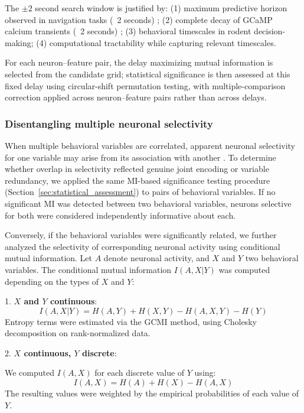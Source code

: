 The $\pm2$ second search window is justified by: (1) maximum predictive horizon
observed in navigation tasks (~2 seconds) \citep{Lian2022}; (2) complete decay of
GCaMP calcium transients (~2 seconds) \citep{Zhang2023}; (3) behavioral timescales
in rodent decision-making; (4) computational tractability while capturing relevant
timescales.

For each neuron--feature pair, the delay maximizing mutual information is selected
from the candidate grid; statistical significance is then assessed at this fixed
delay using circular-shift permutation testing, with multiple-comparison correction
applied across neuron--feature pairs rather than across delays.


\subsubsection{Disentangling multiple neuronal selectivity}
\label{sec:disentangling_selectivity}


When multiple behavioral variables are correlated, apparent neuronal selectivity
for one variable may arise from its association with another \citep{mix,mix3}.
To determine whether overlap in selectivity reflected genuine joint encoding or
variable redundancy, we applied the same MI-based significance testing procedure
(Section~\ref{sec:statistical_assessment}) to pairs of behavioral variables. If no significant MI was detected between two behavioral
variables, neurons selective for both were considered independently informative
about each.

Conversely, if the behavioral variables were significantly related, we further
analyzed the selectivity of corresponding neuronal activity using conditional mutual
information.
Let $A$ denote neuronal activity, and $X$ and $Y$ two behavioral variables. The
conditional mutual information $I(A,X|Y)$ was computed depending on the types of $X$
and $Y$:

1. \textbf{$X$ and $Y$ continuous}:
\begin{equation*}
I(A,X|Y) = H(A,Y) + H(X,Y) - H(A,X,Y) - H(Y)
\end{equation*}
Entropy terms were estimated via the GCMI method, using Cholesky decomposition on
rank-normalized data.

2. \textbf{$X$ continuous, $Y$ discrete}:

We computed $I(A,X)$ for each discrete value of $Y$ using:
\begin{equation*}
I(A,X) = H(A) + H(X) - H(A,X)
\end{equation*}
The resulting values were weighted by the empirical probabilities of each value of
$Y$.

